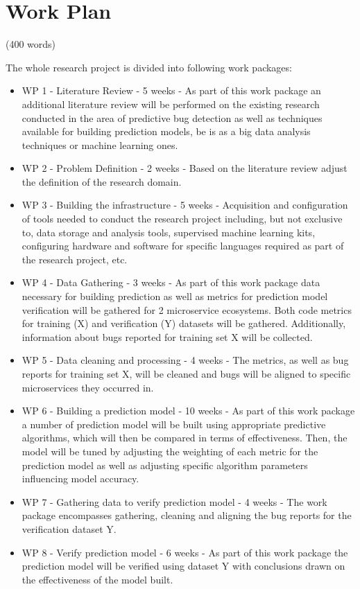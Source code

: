 \chapter{Work Plan}
(400 words)

The whole research project is divided into following work packages:
\begin{itemize}
\item WP 1 - Literature Review - 5 weeks - As part of this work package an additional literature review will be performed on the existing research conducted in the area of predictive bug detection as well as techniques available for building prediction models, be is as a big data analysis techniques or machine learning ones.
\item WP 2 - Problem Definition - 2 weeks - Based on the literature review adjust the definition of the research domain.
\item WP 3 - Building the infrastructure - 5 weeks - Acquisition and configuration of tools needed to conduct the research project including, but not exclusive to, data storage and analysis tools, supervised machine learning kits, configuring hardware and software for specific languages required as part of the research project, etc.
\item WP 4 - Data Gathering - 3 weeks - As part of this work package data necessary for building prediction as well as metrics for prediction model verification will be gathered for 2 microservice ecosystems. Both code metrics for training (X) and verification (Y) datasets will be gathered. Additionally, information about bugs reported for training set X will be collected. 
\item WP 5 - Data cleaning and processing - 4 weeks - The metrics, as well as bug reports for training set X, will be cleaned and bugs will be aligned to specific microservices they occurred in.
\item WP 6 - Building a prediction model - 10 weeks - As part of this work package a number of prediction model will be built using appropriate predictive algorithms, which will then be compared in terms of effectiveness. Then, the model will be tuned by adjusting the weighting of each metric for the prediction model as well as adjusting specific algorithm parameters influencing model accuracy.
\item WP 7 - Gathering data to verify prediction model - 4 weeks - The work package encompasses gathering, cleaning and aligning the bug reports for the verification dataset Y.
\item WP 8 - Verify prediction model - 6 weeks - As part of this work package the prediction model will be verified using dataset Y with conclusions drawn on the effectiveness of the model built.
\end{itemize}

